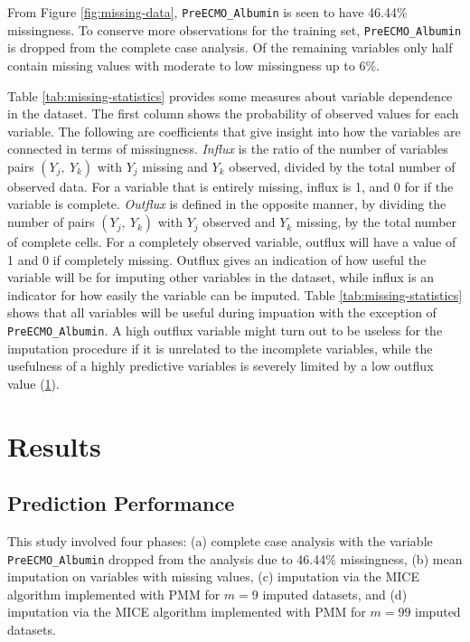 \documentclass[12pt,]{article}
\begin{document}
From Figure \ref{fig:missing-data}, \texttt{PreECMO\_Albumin} is seen to
have 46.44\% missingness. To conserve more observations for the training
set, \texttt{PreECMO\_Albumin} is dropped from the complete case
analysis. Of the remaining variables only half contain missing values
with moderate to low missingness up to 6\%.

Table \ref{tab:missing-statistics} provides some measures about variable
dependence in the dataset. The first column shows the probability of
observed values for each variable. The following are coefficients that
give insight into how the variables are connected in terms of
missingness. \emph{Influx} is the ratio of the number of variables pairs
\((Y_j, ~Y_k)\) with \(Y_j\) missing and \(Y_k\) observed, divided by
the total number of observed data. For a variable that is entirely
missing, influx is 1, and 0 for if the variable is complete.
\emph{Outflux} is defined in the opposite manner, by dividing the number
of pairs \((Y_j, ~Y_k)\) with \(Y_j\) observed and \(Y_k\) missing, by
the total number of complete cells. For a completely observed variable,
outflux will have a value of 1 and 0 if completely missing. Outflux
gives an indication of how useful the variable will be for imputing
other variables in the dataset, while influx is an indicator for how
easily the variable can be imputed. Table \ref{tab:missing-statistics}
shows that all variables will be useful during impuation with the
exception of \texttt{PreECMO\_Albumin}. A high outflux variable might
turn out to be useless for the imputation procedure if it is unrelated
to the incomplete variables, while the usefulness of a highly predictive
variables is severely limited by a low outflux value
(\protect\hyperlink{ref-van_buuren_flexible_2012}{1}).

\newpage

\section{Results}\label{results}

\subsection{Prediction Performance}\label{prediction-performance}

This study involved four phases: (a) complete case analysis with the
variable \texttt{PreECMO\_Albumin} dropped from the analysis due to
46.44\% missingness, (b) mean imputation on variables with missing
values, (c) imputation via the MICE algorithm implemented with PMM for
\(m=9\) imputed datasets, and (d) imputation via the MICE algorithm
implemented with PMM for \(m=99\) imputed datasets.
\end{document}
